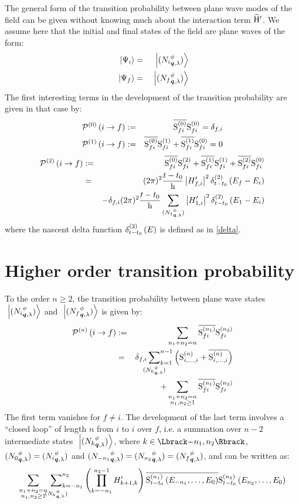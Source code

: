 \documentclass[10pt,a4paper,twoside,openany]{book}
\begin{document}
The general form of the transition probability between plane wave modes of the field can be given without knowing much about the interaction term $\Hop'$. We assume here that the initial and final states of the field are plane waves of the form:
\begin{eqnarray*}
\ket{\Psi_i} & = & \ket{\bFQ {N_i} \pt \q \sp} \\
\ket{\Psi_f} & = & \ket{\bFQ {N_f} \pt \q \sp}
\end{eqnarray*}
The first interesting terms in the development of the transition probability are given in that case by:
\begin{eqnarray*}
\TPn i f 0 & \eqdef & \cc{\Smn f i 0} \Smn f i 0 = \delta_{f,i} \\
\TPn i f 1 & \eqdef & \cc{\Smn f i 0} \Smn f i 1 + \cc{\Smn f i 1} \Smn f i 0 = 0
\end{eqnarray*}
\begin{eqnarray*}
\TPn i f 2 & \eqdef & \cc{\Smn f i 0} \Smn f i 2 + \cc{\Smn f i 1} \Smn f i 1 + \cc{\Smn f i 2} \Smn f i 0 \\
& = & ( 2 \pi )^2 \frac{t - t_0} \h \left| H'_{f,i} \right|^2 \deltaE2{E_f - E_i} \\
&& -\delta_{f,i} ( 2 \pi )^2 \frac{t - t_0} \h \sum_{\bFQ {N_1} \pt \q \sp} \left| H'_{1,i} \right|^2 \deltaE2{E_1 - E_i}
\end{eqnarray*}
where the nascent delta function $\deltaE2{E}$ is defined as in \ref{delta}.

\section{Higher order transition probability}

To the order $n \geq 2$, the transition probability between plane wave states $\ket{\bFQ {N_i} \pt \q \sp}$ and $\ket{\bFQ {N_f} \pt \q \sp}$ is given by:
\begin{eqnarray*}
\TPn i f n & \eqdef & \sum_{n_1 + n_2 = n} \cc{\Smn f i {n_1}} \Smn f i {n_2} \\
& = & \delta_{f,i} \sideset{}{_{k=1}^{n-1}}\sum_{\bFQ {N_k} \pt \q \sp} \left( \Smp n {i,\dotsc,i} + \cc{\Smp n {i,\dotsc,i}} \right) \\
&& + \sum_{\substack{n_1 + n_2 = n \\ n_1, n_2 \geq 1}} \cc{\Smn f i {n_1}} \Smn f i {n_2}
\end{eqnarray*}
The first term vanishes for $f \neq i$. The development of the last term involves a ``closed loop'' of length $n$ from $i$ to $i$ over $f$, i.e. a summation over $n - 2$ intermediate states $\ket{\bFQ {N_k} \pt \q \sp}$, where $k \in \IntRange{-n_1}{n_2}$, $\bFQ {N_0} \pt \q \sp = \bFQ {N_i} \pt \q \sp$ and $\bFQ {N_{-n_1}} \pt \q \sp = \bFQ {N_{n_2}} \pt \q \sp = \bFQ {N_f} \pt \q \sp$, and can be written as:
\begin{multline*}
\sum_{\substack{n_1 + n_2 = n \\ n_1, n_2 \geq 1}} \sideset{}{_{k=-n_1}^{n_2}}\sum_{\bFQ {N_k} \pt \q \sp} \left( \prod_{k = -n_1}^{n_2 - 1} H'_{k+1,k} \right) \cc{\SmE{n_1}{E_{-n_1}, \dotsc, E_0}} \SmE{n_2}{E_{n_2}, \dotsc, E_0}
\end{multline*}
\end{document}
